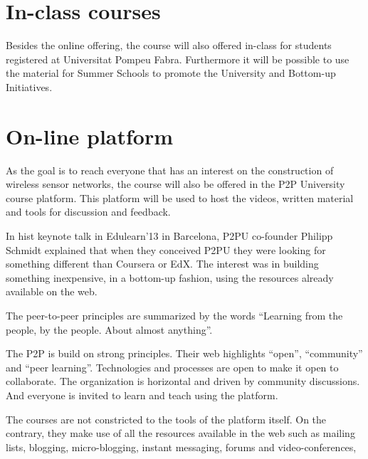 \documentclass[oneside]{book}   %
\begin{document}

\section{In-class courses}
Besides the online offering, the course will also offered in-class for students registered at Universitat Pompeu Fabra.
Furthermore it will be possible to use the material for Summer Schools to promote the University and Bottom-up Initiatives.

\section{On-line platform}

As the goal is to reach everyone that has an interest on the construction of wireless sensor networks, the course will also be offered in the P2P University course platform.
This platform will be used to host the videos, written material and tools for discussion and feedback.

In hist keynote talk in Edulearn'13 in Barcelona, P2PU co-founder Philipp Schmidt explained that when they conceived P2PU they were looking for something different than Coursera or EdX.
The interest was in building something inexpensive, in a bottom-up fashion, using the resources already available on the web.

The peer-to-peer principles are summarized by the words ``Learning from the people, by the people. About almost anything''.

The P2P is build on strong principles. 
Their web highlights ``open'', ``community'' and ``peer learning''.
Technologies and processes are open to make it open to collaborate.
The organization is horizontal and driven by community discussions.
And everyone is invited to learn and teach using the platform.

The courses are not constricted to the tools of the platform itself. 
On the contrary, they make use of all the resources available in the web such as mailing lists, blogging, micro-blogging, instant messaging, forums and video-conferences, 
\end{document}
